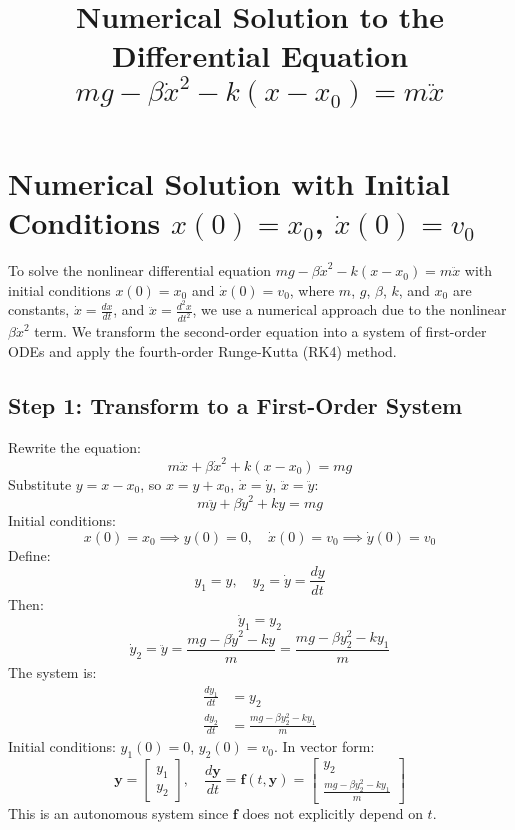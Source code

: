 \documentclass[a4paper,12pt]{article}
\begin{document}
\title{Numerical Solution to the Differential Equation \(mg - \beta \dot{x}^2 - k(x - x_0) = m \ddot{x}\)}
\author{}
\date{}
\maketitle

\section*{Numerical Solution with Initial Conditions \(x(0) = x_0\), \(\dot{x}(0) = v_0\)}

To solve the nonlinear differential equation \(mg - \beta \dot{x}^2 - k(x - x_0) = m \ddot{x}\) with initial conditions \(x(0) = x_0\) and \(\dot{x}(0) = v_0\), where \(m\), \(g\), \(\beta\), \(k\), and \(x_0\) are constants, \(\dot{x} = \frac{dx}{dt}\), and \(\ddot{x} = \frac{d^2x}{dt^2}\), we use a numerical approach due to the nonlinear \(\beta \dot{x}^2\) term. We transform the second-order equation into a system of first-order ODEs and apply the fourth-order Runge-Kutta (RK4) method.

\subsection*{Step 1: Transform to a First-Order System}
Rewrite the equation:
\begin{equation}
m \ddot{x} + \beta \dot{x}^2 + k(x - x_0) = mg
\end{equation}
Substitute \(y = x - x_0\), so \(x = y + x_0\), \(\dot{x} = \dot{y}\), \(\ddot{x} = \ddot{y}\):
\begin{equation}
m \ddot{y} + \beta \dot{y}^2 + k y = mg
\end{equation}
Initial conditions:
\[
x(0) = x_0 \implies y(0) = 0, \quad \dot{x}(0) = v_0 \implies \dot{y}(0) = v_0
\]
Define:
\[
y_1 = y, \quad y_2 = \dot{y} = \frac{dy}{dt}
\]
Then:
\[
\dot{y}_1 = y_2
\]
\[
\dot{y}_2 = \ddot{y} = \frac{mg - \beta \dot{y}^2 - k y}{m} = \frac{mg - \beta y_2^2 - k y_1}{m}
\]
The system is:
\begin{align}
\frac{dy_1}{dt} &= y_2 \\
\frac{dy_2}{dt} &= \frac{mg - \beta y_2^2 - k y_1}{m}
\end{align}
Initial conditions: \(y_1(0) = 0\), \(y_2(0) = v_0\). In vector form:
\[
\mathbf{y} = \begin{bmatrix} y_1 \\ y_2 \end{bmatrix}, \quad \frac{d\mathbf{y}}{dt} = \mathbf{f}(t, \mathbf{y}) = \begin{bmatrix} y_2 \\ \frac{mg - \beta y_2^2 - k y_1}{m} \end{bmatrix}
\]
This is an autonomous system since \(\mathbf{f}\) does not explicitly depend on \(t\).
\end{document}
